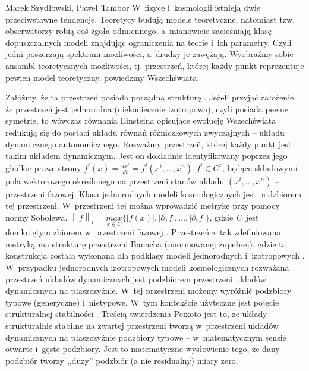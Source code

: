 \begin{artplenv2auth}{Marek Szydłowski, Paweł Tambor}
W~fizyce i~kosmologii istnieją dwie przeciwstawne tendencje. Teoretycy budują modele teoretyczne, natomiast tzw. obserwatorzy robią coś zgoła odmiennego, a~mianowicie zacieśniają klasę dopuszczalnych modeli znajdując ograniczenia na teorie i~ich parametry. Czyli jedni poszerzają spektrum możliwości, a~drudzy je zawężają. Wyobraźmy sobie ansambl teoretycznych możliwości, tj. przestrzeń, której każdy punkt reprezentuje pewien model teoretyczny, powiedzmy Wszechświata.

Załóżmy, że ta przestrzeń posiada porządną strukturę
\parencite[][]{szydlowski_metoda_1982}. %
 Jeżeli przyjąć założenie, że przestrzeń jest jednorodna (niekoniecznie izotropowa), czyli posiada pewne symetrie, to wówczas równania Einsteina opisujące ewolucję Wszechświata redukują się do postaci układu równań różniczkowych zwyczajnych -- układu dynamicznego autonomicznego. Rozważmy przestrzeń, której każdy punkt jest takim układem dynamicznym. Jest on dokładnie identyfikowany poprzez jego gładkie prawe strony $f^i\left(x\right)=\frac{\mathit{dx}^i}{\mathit{dt}}=f^i\left(x^i,{\dots},x^n\right);f^i{\in}C^r$, będące składowymi pola wektorowego określonego na przestrzeni stanów układu $\left(x^i,{\dots},x^n\right)$ -- przestrzeni fazowej. Klasa jednorodnych modeli kosmologicznych jest podzbiorem tej przestrzeni. W~przestrzeni tej można wprowadzić metrykę przy pomocy normy Sobolewa. $\left\|f\right\|_r=\underset{x{\in}C}{\mathit{max}}\{\left|f\left(x\right)\right|,\left|{\partial}_1f\right|,{\dots},\left|{\partial}_rf\right|\}$, gdzie \textit{C}~jest domkniętym zbiorem w~przestrzeni fazowej 
\parencite[][]{perko_differential_1996}. %
 Przestrzeń z~tak zdefiniowaną metryką ma strukturę przestrzeni Banacha (unormowanej zupełnej), gdzie ta konstrukcja została wykonana dla podklasy modeli jednorodnych i~izotropowych 
\parencites[][]{szydlowski_towards_2007}[por.][]{szydlowski_cosmological_2007}. %
 W~przypadku jednorodnych izotropowych modeli kosmologicznych rozważana przestrzeń układów dynamicznych jest podzbiorem przestrzeni układów dynamicznych na płaszczyźnie. W~tej przestrzeni możemy wyróżnić podzbiory typowe (generyczne) i~nietypowe. W~tym kontekście użyteczne jest pojęcie strukturalnej stabilności 
\parencite[][]{tambor_czy_2017}. %
 Treścią twierdzenia Peixoto jest to, że układy strukturalnie stabilne na zwartej przestrzeni tworzą w~przestrzeni układów dynamicznych na płaszczyźnie podzbiory typowe -- w~matematycznym sensie otwarte i~gęste podzbiory. Jest to matematyczne wysłowienie tego, że dany podzbiór tworzy ,,duży'' podzbiór (a nie residualny) miary zero.
 

\end{artplenv2auth}
